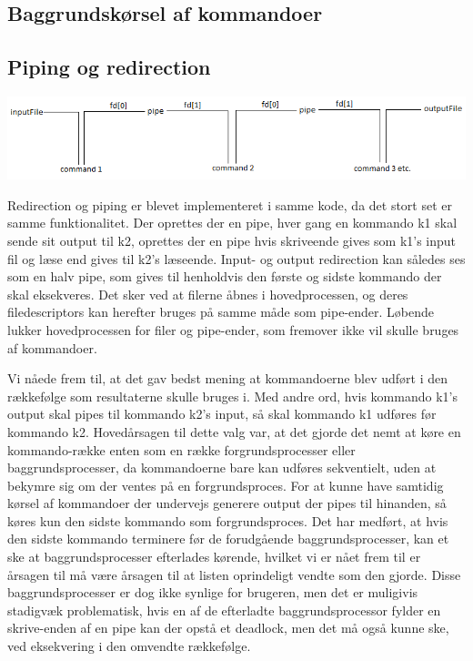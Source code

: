 \subsection{Baggrundskørsel af kommandoer}

\subsection{Piping og redirection}
\label{subsec:pipe_redirect}
\includegraphics[width=1.1\textwidth]{pipefig}\par\vspace{1cm}
Redirection og piping er blevet implementeret i samme kode, da det stort set er samme funktionalitet.
Der oprettes der en pipe, hver gang en kommando k1 skal sende sit output til k2, oprettes der en pipe hvis skriveende gives som k1's input fil og læse end gives til k2's læseende. Input- og output redirection kan således ses som en halv pipe, som gives til henholdvis den første og sidste kommando der skal eksekveres. Det sker ved at filerne åbnes i hovedprocessen, og deres filedescriptors kan herefter bruges på samme måde som pipe-ender. Løbende lukker hovedprocessen for filer og pipe-ender, som fremover ikke vil skulle bruges af kommandoer.

Vi nåede frem til, at det gav bedst mening at kommandoerne blev udført i den rækkefølge som resultaterne skulle bruges i.
Med andre ord, hvis kommando k1's output skal pipes til kommando k2's input, så skal kommando k1 udføres før kommando k2.
Hovedårsagen til dette valg var, at det gjorde det nemt at køre en kommando-række enten som en række forgrundsprocesser eller baggrundsprocesser, da kommandoerne bare kan udføres sekventielt, uden at bekymre sig om der ventes på en forgrundsproces. For at kunne have samtidig kørsel af kommandoer der undervejs generere output der pipes til hinanden, så køres kun den sidste kommando som forgrundsproces. Det har medført, at hvis den sidste kommando terminere før de forudgående baggrundsprocesser, kan et ske at baggrundsprocesser efterlades kørende, hvilket vi er nået frem til er årsagen til må være årsagen til at listen oprindeligt vendte som den gjorde. Disse baggrundsprocesser er dog ikke synlige for brugeren, men det er muligivis stadigvæk problematisk, hvis en af de efterladte baggrundsprocessor fylder en skrive-enden af en pipe kan der opstå et deadlock, men det må også kunne ske, ved eksekvering i den omvendte rækkefølge.

